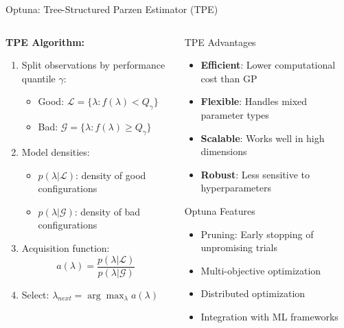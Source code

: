 \documentclass[8pt,aspectratio=1610]{beamer}
\begin{document}
\begin{frame}{Optuna: Tree-Structured Parzen Estimator (TPE)}
\begin{columns}[t]
\begin{column}{0.55\textwidth}
\textbf{TPE Algorithm:}
\begin{enumerate}
\setlength{\itemsep}{3pt}
\item Split observations by performance quantile $\gamma$:
\begin{itemize}
\item Good: $\mathcal{L} = \{\lambda: f(\lambda) < Q_\gamma\}$
\item Bad: $\mathcal{G} = \{\lambda: f(\lambda) \geq Q_\gamma\}$
\end{itemize}
\item Model densities:
\begin{itemize}
\item $p(\lambda|\mathcal{L})$: density of good configurations
\item $p(\lambda|\mathcal{G})$: density of bad configurations
\end{itemize}
\item Acquisition function:
$$a(\lambda) = \frac{p(\lambda|\mathcal{L})}{p(\lambda|\mathcal{G})}$$
\item Select: $\lambda_{next} = \arg\max_\lambda a(\lambda)$
\end{enumerate}
\end{column}

\begin{column}{0.41\textwidth}
\begin{block}{TPE Advantages}
\begin{itemize}
\setlength{\itemsep}{3pt}
\item \textbf{Efficient}: Lower computational cost than GP
\item \textbf{Flexible}: Handles mixed parameter types
\item \textbf{Scalable}: Works well in high dimensions
\item \textbf{Robust}: Less sensitive to hyperparameters
\end{itemize}
\end{block}

\begin{block}{Optuna Features}
\begin{itemize}
\setlength{\itemsep}{2pt}
\item Pruning: Early stopping of unpromising trials
\item Multi-objective optimization
\item Distributed optimization
\item Integration with ML frameworks
\end{itemize}
\end{block}
\end{column}
\end{columns}


\end{frame}
\end{document}
